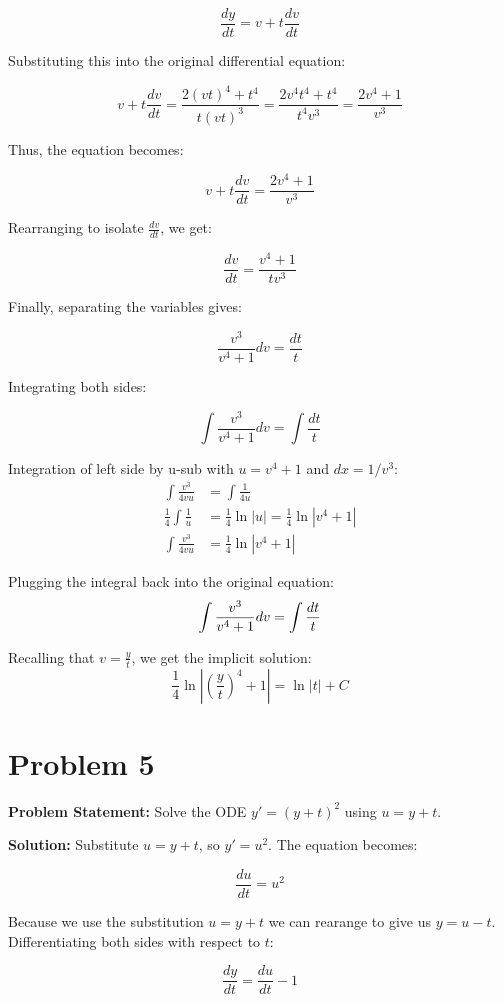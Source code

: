 \documentclass[12pt, letterpaper]{article}
\begin{document}
\[
\frac{dy}{dt} = v + t \frac{dv}{dt}
\]

Substituting this into the original differential equation:

\[
v + t \frac{dv}{dt} = \frac{2(vt)^4 + t^4}{t(vt)^3} = \frac{2v^4t^4 + t^4}{t^4v^3} = \frac{2v^4 + 1}{v^3}
\]

Thus, the equation becomes:

\[
v + t \frac{dv}{dt} = \frac{2v^4 + 1}{v^3}
\]

Rearranging to isolate \( \frac{dv}{dt} \), we get:

\[
\frac{dv}{dt} = \frac{v^4 + 1}{tv^3}
\]

Finally, separating the variables gives:

\[
\frac{v^3}{v^4+1} dv = \frac{dt}{t}
\]

Integrating both sides:

\[
\int \frac{v^3}{v^4+1} dv = \int \frac{dt}{t}
\]

Integration of left side by u-sub with $u = v^4 + 1$ and $dx = 1/v^3$:
\begin{align*}
\int \frac{v^3}{4vu} &= \int \frac{1}{4u} \\
\frac{1}{4} \int \frac{1}{u} &= \frac{1}{4} \ln|u| = \frac{1}{4} \ln|v^4 + 1| \\
\int \frac{v^3}{4vu} &= \frac{1}{4} \ln|v^4 + 1|
\end{align*}

Plugging the integral back into the original equation:
\[
\int \frac{v^3}{v^4+1} dv = \int \frac{dt}{t} \\
\]

Recalling that $v = \frac{y}{t}$, we get the implicit solution:
\[
\frac{1}{4} \ln|(\frac{y}{t})^4 + 1| = \ln|t| + C
\]


\section*{Problem 5}

\textbf{Problem Statement:} Solve the ODE \( y' = (y + t)^2 \) using \( u = y + t \).

\textbf{Solution:}
Substitute \( u = y + t \), so \( y' = u^2 \). The equation becomes:

\[
\frac{du}{dt} = u^2
\]

Because we use the substitution \( u = y + t \) we can rearange to give us \( y = u - t \). Differentiating both sides with respect to \( t \):

\[
\frac{dy}{dt} = \frac{du}{dt} - 1
\]
\end{document}

